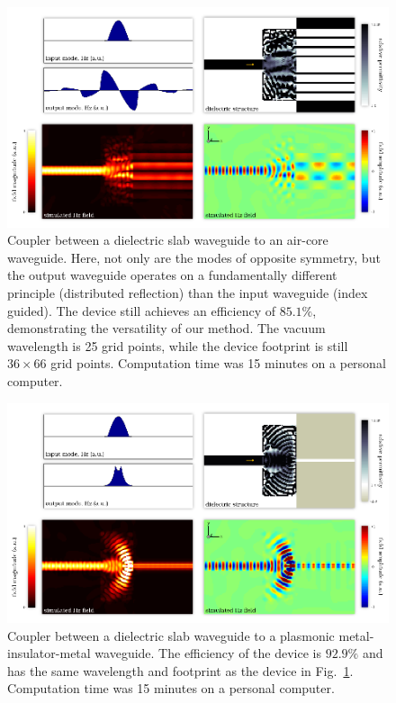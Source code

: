\documentclass[letterpaper,10pt]{article}
\begin{document}
\begin{figure}[htbp]
    \centering
    \includegraphics[width=\textwidth]{3}
    \caption{Coupler between a dielectric slab waveguide to 
            an air-core waveguide.
        Here, not only are the modes of opposite symmetry,
            but the output waveguide operates on a fundamentally different
            principle (distributed reflection) than the input waveguide 
            (index guided).
        The device still achieves an efficiency of $85.1\%$, demonstrating the
            versatility of our method.
        The vacuum wavelength is 25 grid points, 
            while the device footprint is still $36 \times 66$ grid points.
        Computation time was 15 minutes on a personal computer.
        }
        \label{fig:aircore}
\end{figure}
\begin{figure}[htbp]
    \centering
    \includegraphics[width=\textwidth]{4}
    \caption{Coupler between a dielectric slab waveguide to 
            a plasmonic metal-insulator-metal waveguide.
        The efficiency of the device is $92.9\%$ and 
            has the same wavelength and footprint as the device in
            Fig.~\ref{fig:aircore}.
        Computation time was 15 minutes on a personal computer.
        }
        \label{fig:mim}
\end{figure}
\end{document}
